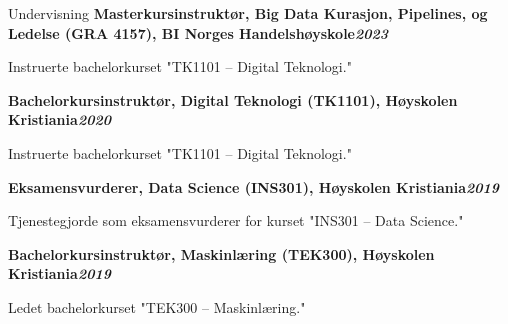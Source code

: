 \begin{rubric}{Undervisning}
\entry*[]%
\textbf{Masterkursinstruktør, Big Data Kurasjon, Pipelines, og Ledelse (GRA 4157), BI Norges Handelshøyskole\hfill\textit{2023}} \par
\begin{compactitem}
    \item Instruerte bachelorkurset "TK1101 – Digital Teknologi."
    \vspace{-12pt}
\end{compactitem}
%
\entry*[]%
\textbf{Bachelorkursinstruktør, Digital Teknologi (TK1101), Høyskolen Kristiania\hfill\textit{2020}} \par
\begin{compactitem}
    \item Instruerte bachelorkurset "TK1101 – Digital Teknologi."
    \vspace{-12pt}
\end{compactitem}
%
\entry*[]%
\textbf{Eksamensvurderer, Data Science (INS301), Høyskolen Kristiania\hfill\textit{2019}} \par
\begin{compactitem}
    \item Tjenestegjorde som eksamensvurderer for kurset "INS301 – Data Science."
    \vspace{-12pt}
\end{compactitem}
%
\entry*[]%
\textbf{Bachelorkursinstruktør, Maskinlæring (TEK300), Høyskolen Kristiania\hfill\textit{2019}} \par
\begin{compactitem}
    \item Ledet bachelorkurset "TEK300 – Maskinlæring."

\end{compactitem}
\end{rubric}
